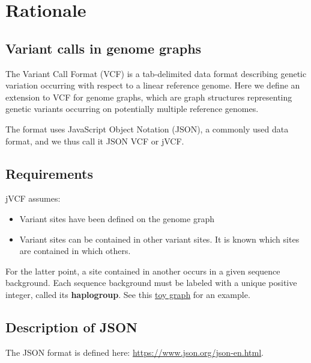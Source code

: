 \newpage

\hypertarget{rationale}{%
\section{Rationale}\label{rationale}}

\hypertarget{variant-calls-in-genome-graphs}{%
\subsection{Variant calls in genome
graphs}\label{variant-calls-in-genome-graphs}}

The Variant Call Format (VCF) is a tab-delimited data format describing
genetic variation occurring with respect to a linear reference genome.
Here we define an extension to VCF for genome graphs, which are graph
structures representing genetic variants occurring on potentially
multiple reference genomes.

The format uses JavaScript Object Notation (JSON), a commonly used data
format, and we thus call it JSON VCF or jVCF.

\hypertarget{requirements}{%
\subsection{Requirements}\label{requirements}}

jVCF assumes:

\begin{itemize}
\tightlist
\item
  Variant sites have been defined on the genome graph
\item
  Variant sites can be contained in other variant sites. It is known
  which sites are contained in which others.
\end{itemize}

For the latter point, a site contained in another occurs in a given
sequence background. Each sequence background must be labeled with a
unique positive integer, called its \textbf{haplogroup}. See this
\protect\hyperlink{example}{toy graph} for an example.

\hypertarget{description-of-json}{%
\subsection{Description of JSON}\label{description-of-json}}

The JSON format is defined here:
\url{https://www.json.org/json-en.html}.

